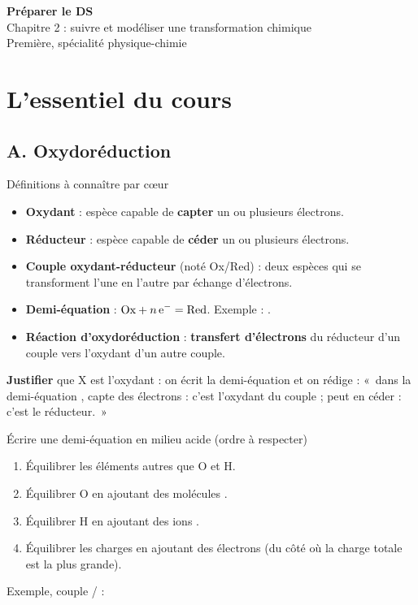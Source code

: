 \documentclass[11pt,a4paper]{article}
\begin{document}
\begin{center}
  {\LARGE\bfseries\color{bleu} Préparer le DS}\\[4pt]
  {\Large Chapitre 2 : suivre et modéliser une transformation chimique}\\[2pt]
  {\small Première, spécialité physique-chimie}
\end{center}

\section{L'essentiel du cours}

\subsection*{A. Oxydoréduction}

\begin{definition}{Définitions à connaître par cœur}
\begin{itemize}
  \item \textbf{Oxydant} : espèce capable de \textbf{capter} un ou plusieurs électrons.
  \item \textbf{Réducteur} : espèce capable de \textbf{céder} un ou plusieurs électrons.
  \item \textbf{Couple oxydant-réducteur} (noté Ox/Red) : deux espèces qui se transforment l'une en l'autre par échange d'électrons.
  \item \textbf{Demi-équation} : $\text{Ox} + n\,\ce{e-} = \text{Red}$. Exemple : .
  \item \textbf{Réaction d'oxydoréduction} : \textbf{transfert d'électrons} du réducteur d'un couple vers l'oxydant d'un autre couple.
\end{itemize}
\end{definition}

\textbf{Justifier} que X est l'oxydant : on écrit la demi-équation et on rédige : «~dans la demi-équation ,  capte des électrons : c'est l'oxydant du couple ;  peut en céder : c'est le réducteur.~»

\begin{methode}{Écrire une demi-équation en milieu acide (ordre à respecter)}
\begin{enumerate}
  \item Équilibrer les éléments autres que O et H.
  \item Équilibrer O en ajoutant des molécules .
  \item Équilibrer H en ajoutant des ions .
  \item Équilibrer les charges en ajoutant des électrons  (du côté où la charge totale est la plus grande).
\end{enumerate}
Exemple, couple / :\quad {}
\end{methode}
\end{document}

